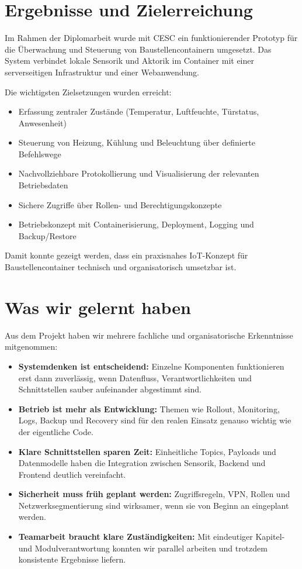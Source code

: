 
\section{Ergebnisse und Zielerreichung}

Im Rahmen der Diplomarbeit wurde mit CESC ein funktionierender Prototyp für die Überwachung und Steuerung von Baustellencontainern umgesetzt. Das System verbindet lokale Sensorik und Aktorik im Container mit einer serverseitigen Infrastruktur und einer Webanwendung.

Die wichtigsten Zielsetzungen wurden erreicht:

\begin{itemize}
    \item Erfassung zentraler Zustände (Temperatur, Luftfeuchte, Türstatus, Anwesenheit)
    \item Steuerung von Heizung, Kühlung und Beleuchtung über definierte Befehlswege
    \item Nachvollziehbare Protokollierung und Visualisierung der relevanten Betriebsdaten
    \item Sichere Zugriffe über Rollen- und Berechtigungskonzepte
    \item Betriebskonzept mit Containerisierung, Deployment, Logging und Backup/Restore
\end{itemize}

Damit konnte gezeigt werden, dass ein praxisnahes IoT-Konzept für Baustellencontainer technisch und organisatorisch umsetzbar ist.

\section{Was wir gelernt haben}

Aus dem Projekt haben wir mehrere fachliche und organisatorische Erkenntnisse mitgenommen:

\begin{itemize}
    \item \textbf{Systemdenken ist entscheidend:} Einzelne Komponenten funktionieren erst dann zuverlässig, wenn Datenfluss, Verantwortlichkeiten und Schnittstellen sauber aufeinander abgestimmt sind.
    \item \textbf{Betrieb ist mehr als Entwicklung:} Themen wie Rollout, Monitoring, Logs, Backup und Recovery sind für den realen Einsatz genauso wichtig wie der eigentliche Code.
    \item \textbf{Klare Schnittstellen sparen Zeit:} Einheitliche Topics, Payloads und Datenmodelle haben die Integration zwischen Sensorik, Backend und Frontend deutlich vereinfacht.
    \item \textbf{Sicherheit muss früh geplant werden:} Zugriffsregeln, VPN, Rollen und Netzwerksegmentierung sind wirksamer, wenn sie von Beginn an eingeplant werden.
    \item \textbf{Teamarbeit braucht klare Zuständigkeiten:} Mit eindeutiger Kapitel- und Modulverantwortung konnten wir parallel arbeiten und trotzdem konsistente Ergebnisse liefern.
\end{itemize}

